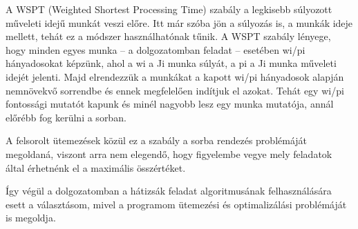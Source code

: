 A WSPT (Weighted Shortest Processing Time) szabály a legkisebb súlyozott műveleti idejű munkát veszi előre. Itt már szóba jön a súlyozás is, a munkák ideje mellett, tehát ez a módszer használhatónak tűnik. A WSPT szabály lényege, hogy minden egyes munka – a dolgozatomban feladat – esetében wi/pi hányadosokat képzünk, ahol a wi a Ji munka súlyát, a pi a Ji munka műveleti idejét jelenti. Majd elrendezzük a munkákat a kapott wi/pi hányadosok alapján nemnövekvő sorrendbe és ennek megfelelően indítjuk el azokat.  Tehát egy wi/pi fontossági mutatót kapunk és minél nagyobb lesz egy munka mutatója, annál előrébb fog kerülni a sorban.

A felsorolt ütemezések közül ez a szabály a sorba rendezés problémáját megoldaná, viszont arra nem elegendő, hogy figyelembe vegye mely feladatok által érhetnénk el a maximális összértéket.

Így végül a dolgozatomban a hátizsák feladat algoritmusának felhasználására esett a választásom, mivel a programom ütemezési és optimalizálási problémáját is megoldja.
